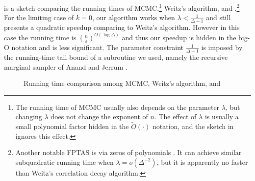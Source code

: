 \documentclass{theoretics}
\newcommand{\eps}{\varepsilon}
\begin{document}
 is a sketch comparing the running times of MCMC,\footnote{The running time of MCMC usually also depends on the parameter $\lambda$, but changing $\lambda$ does not change the exponent of $n$. The effect of $\lambda$ is usually a small polynomial factor hidden in the $\widetilde{O}(\cdot)$ notation, and the sketch in  ignores this effect.} Weitz's algorithm, and .\footnote{Another notable FPTAS is via zeros of polynomials \cite{Bar16,PR17}. It can achieve similar subquadratic running time when $\lambda=o(\Delta^{-2})$, but it is apparently no faster than Weitz's correlation decay algorithm.}
For the limiting case of $k=0$, our algorithm works when $\lambda<\frac{1}{\Delta-1}$ and still presents a quadratic speedup comparing to Weitz's algorithm.
However in this case the running time is $\left( \frac{n}{\eps} \right)^{O(\log \Delta)}$ and thus our speedup is hidden in the big-O notation and is less significant.
The parameter constraint $\frac{1}{\Delta-1}$ is imposed by the running-time tail bound of a subroutine we used, namely the recursive marginal sampler of Anand and Jerrum \cite{AJ22}.


\begin{figure}[!htbp]
  \centering
  \caption{Running time comparison among MCMC, Weitz's algorithm, and }
  \label{fig:run-time}
\end{figure}
\end{document}

